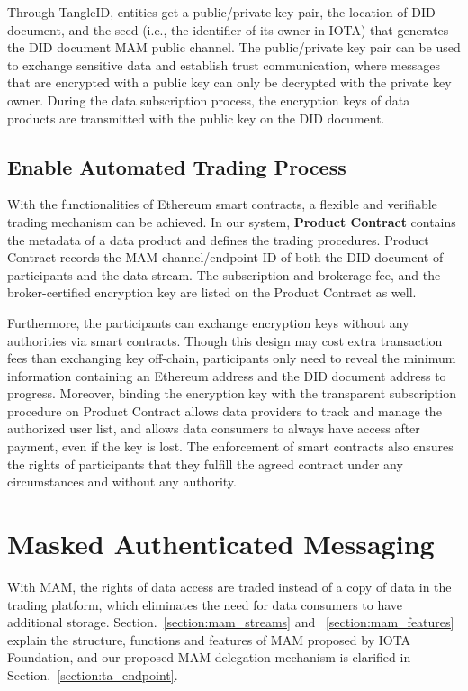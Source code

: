 \documentclass[10pt, conference, compsocconf]{IEEEtran}
\begin{document}
Through TangleID, entities get a public/private key pair, the location of DID document, and the seed (i.e., the identifier of its owner in IOTA) that generates the DID document MAM public channel. The public/private key pair can be used to exchange sensitive data and establish trust communication, where messages that are encrypted with a public key can only be decrypted with the private key owner. During the data subscription process, the encryption keys of data products are transmitted with the public key on the DID document.

\subsection{Enable Automated Trading Process}
With the functionalities of Ethereum smart contracts, a flexible and verifiable trading mechanism can be achieved. In our system, \textbf{Product Contract} contains the metadata of a data product and defines the trading procedures. Product Contract records the MAM channel/endpoint ID of both the DID document of participants and the data stream. The subscription and brokerage fee, and the broker-certified encryption key are listed on the Product Contract as well.

Furthermore, the participants can exchange encryption keys without any authorities via smart contracts. Though this design may cost extra transaction fees than exchanging key off-chain, participants only need to reveal the minimum information containing an Ethereum address and the DID document address to progress. Moreover, binding the encryption key with the transparent subscription procedure on Product Contract allows data providers to track and manage the authorized user list, and allows data consumers to always have access after payment, even if the key is lost. The enforcement of smart contracts also ensures the rights of participants that they fulfill the agreed contract under any circumstances and without any authority.

\section{Masked Authenticated Messaging}
\label{section:MAM}
With MAM, the rights of data access are traded instead of a copy of data in the trading platform, which eliminates the need for data consumers to have additional storage. Section.~\ref{section:mam_streams} and ~\ref{section:mam_features} explain the structure, functions and features of MAM proposed by IOTA Foundation, and our proposed MAM delegation mechanism is clarified in Section.~\ref{section:ta_endpoint}.
\end{document}
